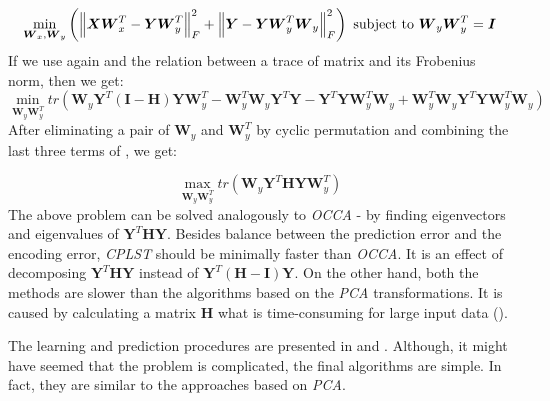 \begin{equation}\label{eq:cplst5}
    \min_{\boldsymbol{W}_x, \boldsymbol{W}_y} \left(\left\lVert\boldsymbol{X}\boldsymbol{W}_x^T-\boldsymbol{Y}\boldsymbol{W}_y^T\right\rVert_{F}^2 + \left\lVert\boldsymbol{Y}-\boldsymbol{Y}\boldsymbol{W}_y^T\boldsymbol{W}_y\right\rVert_{F}^2\right)  
    \text{  subject to   } \boldsymbol{W}_y\boldsymbol{W}_y^T=\boldsymbol{I}   
\end{equation}
If we use again  and the relation between a trace of matrix and its Frobenius norm, then we get:
\begin{equation}\label{eq:cplst6}
    \min_{\boldsymbol{W}_y\boldsymbol{W}_y^T} tr(\boldsymbol{W}_y\boldsymbol{Y}^T(\boldsymbol{I}-\boldsymbol{H})\boldsymbol{Y}\boldsymbol{W}_y^T-\boldsymbol{W}_y^T\boldsymbol{W}_y\boldsymbol{Y}^T\boldsymbol{Y}-\boldsymbol{Y}^T\boldsymbol{Y}\boldsymbol{W}_y^T\boldsymbol{W}_y+\boldsymbol{W}_y^T\boldsymbol{W}_y\boldsymbol{Y}^T\boldsymbol{Y}\boldsymbol{W}_y^T\boldsymbol{W}_y)  
\end{equation}
After eliminating a pair of $\boldsymbol{W}_y$ and $\boldsymbol{W}_y^T$ by cyclic permutation and combining the last three terms of , we get:

\begin{equation}\label{eq:cplst6}
    \max_{\boldsymbol{W}_y\boldsymbol{W}_y^T} tr(\boldsymbol{W}_y\boldsymbol{Y}^T\boldsymbol{H}\boldsymbol{Y}\boldsymbol{W}_y^T)  
\end{equation}
The above problem can be solved analogously to \textit{OCCA} - by finding eigenvectors and eigenvalues of $\boldsymbol{Y}^T\boldsymbol{H}\boldsymbol{Y}$. Besides balance between the prediction error and the encoding error, \textit{CPLST} should be minimally faster than \textit{OCCA}. It is an effect of decomposing $\boldsymbol{Y}^T\boldsymbol{H}\boldsymbol{Y}$ instead of $\boldsymbol{Y}^T(\boldsymbol{H}-\boldsymbol{I})\boldsymbol{Y}$. On the other hand, both the methods are slower than the algorithms based on the \textit{PCA} transformations. It is caused by calculating a matrix $\boldsymbol{H}$ what is time-consuming for large input data (\cite{ChenLin}).

The learning and prediction procedures are presented in  and . Although, it might have seemed that the problem is complicated, the final algorithms are simple. In fact, they are similar to the approaches based on \textit{PCA}. 

\clearpage

